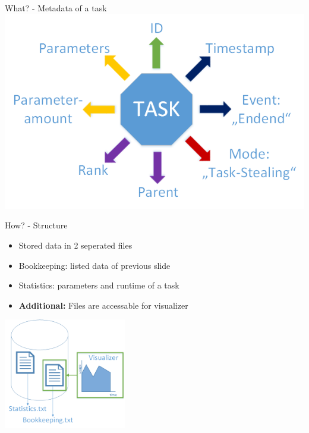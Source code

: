	\begin{frame}{What? - Metadata of a task}
	\includegraphics[width=1.0\textwidth]{images/Task/Zeichnung4.png}
	\end{frame}
	
	\begin{frame}{How? - Structure}
		\begin{itemize}
		\item<1->{} {Stored data in 2 seperated files}
		\item<2->{} {Bookkeeping: listed data of previous slide}
		\item<3->{} {Statistics: parameters and runtime of a task}
		\item<5->{} {\textbf{Additional: }Files are accessable for visualizer}
		\end{itemize}
		\includegraphics[width=0.4\textwidth]{images/Task/data.png}
	\end{frame}

